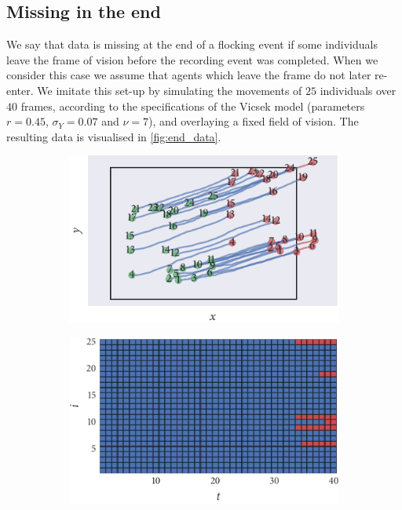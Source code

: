 \subsection{Missing in the end}

We say that data is missing at the end of a flocking event if some individuals
leave the frame of vision before the recording event was completed. When we
consider this case we assume that agents which leave the frame do not later
re-enter. We imitate this set-up by simulating the movements of $25$
individuals over $40$ frames, according to the specifications of the Vicsek
model (parameters $r=0.45$, $\sigma_Y=0.07$ and $\nu=7$), and overlaying a fixed
field of vision. The resulting data is visualised in \cref{fig:end_data}.

\begin{figure}[tbp]
  \begin{subfigure}[b]{0.5\textwidth}
    \includegraphics{end/data.pdf}
    \caption{}
    \label{subfig:end_data}
  \end{subfigure}%
  \begin{subfigure}[b]{0.5\textwidth}
    \includegraphics{end/missing_array.pdf}

\end{subfigure}
\end{figure}

